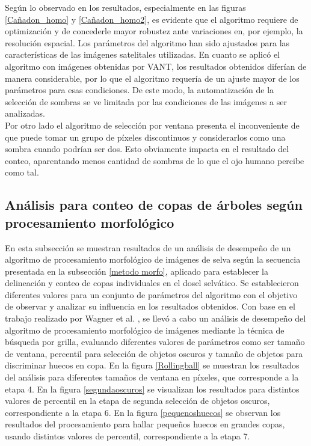 Según lo observado en los resultados, especialmente en las figuras \ref{Cañadon_homo} y \ref{Cañadon_homo2}, es evidente que el algoritmo requiere de optimización y de concederle mayor robustez ante variaciones en, por ejemplo, la resolución espacial. Los parámetros del algoritmo han sido ajustados para las características de las imágenes satelitales utilizadas. En cuanto se aplicó el algoritmo con imágenes obtenidas por VANT, los resultados obtenidos diferían de manera considerable, por lo que el algoritmo requería de un ajuste mayor de los parámetros para esas condiciones. De este modo, la automatización de la selección de sombras se ve limitada por las condiciones de las imágenes a ser analizadas.\\
Por otro lado el algoritmo de selección por ventana presenta el inconveniente de que puede tomar un grupo de píxeles discontinuos y considerarlos como una sombra cuando podrían ser dos. Esto obviamente impacta en el resultado del conteo, aparentando menos cantidad de sombras de lo que el ojo humano percibe como tal.                                                                                                                              

\subsection{Análisis para conteo de copas de árboles según procesamiento morfológico} \label{resultados morfologico}
En esta subsección se muestran resultados de un análisis de desempeño de un algoritmo de procesamiento morfológico de imágenes de selva según la secuencia presentada en la subsección \ref{metodo morfo}, aplicado para establecer la delineación y conteo de copas individuales en el dosel selvático. Se establecieron diferentes valores para un conjunto de parámetros del algoritmo con el objetivo de observar y analizar su influencia en los resultados obtenidos.
Con base en el trabajo realizado por Wagner et al. \cite{hubert_wagner_individual_2018}, se llevó a cabo un análisis de desempeño del algoritmo de procesamiento morfológico de imágenes mediante la técnica de búsqueda por grilla, evaluando diferentes valores de parámetros como ser tamaño de ventana, percentil para selección de objetos oscuros y tamaño de objetos para discriminar huecos en copa. En la figura \ref{Rollingball} se muestran los resultados del análisis para diferentes tamaños de ventana en  píxeles, que corresponde a la etapa 4. En la figura \ref{segundaoscuros} se visualizan los resultados para distintos valores de percentil en la etapa de segunda selección de objetos oscuros, correspondiente a la etapa 6. En la figura \ref{pequenoshuecos} se observan los resultados del procesamiento para hallar pequeños huecos en grandes copas, usando distintos valores de percentil, correspondiente a la etapa 7. 

